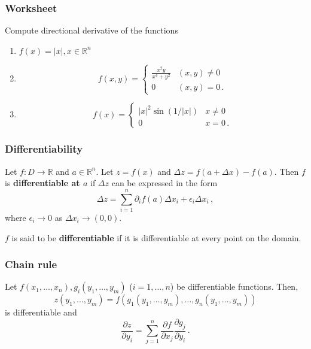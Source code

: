 \documentclass[aspectratio=169,handout]{beamer}
\begin{document}
\begin{frame}
    \frametitle{Worksheet}
    Compute directional derivative of the functions
    \begin{enumerate}
        \item $f(x) = |x|, x\in \mathbb{R}^n$
        \item $$ f(x,y) = 
            \begin{cases}
                \frac{x^2y}{x^4 + y^2} & (x,y) \not= 0 \\
                0 & (x,y) = 0 \,.
            \end{cases}$$
        \item $$ f(x) = 
            \begin{cases}
                |x|^2 \sin(1/|x|) & x\not= 0\\
                0 & x = 0 \,.
            \end{cases}
             $$
    \end{enumerate}
\end{frame}


\begin{frame}
    \frametitle{Differentiability}
\begin{definition}
Let \(f:D \to \mathbb{R}\) and \(a\in \mathbb{R}^n\).
Let \(z = f(x)\) and \(\Delta z = f(a + \Delta x ) - f(a)\).
Then \(f\) is \textbf{differentiable at \(a\)} if \(\Delta z\) can be
expressed in the form
\begin{equation*}
    \Delta z = \sum_{i=1}^n \partial_i f(a) \Delta x_i +  \epsilon_i \Delta x_i  \,,
\end{equation*}
where \(\epsilon_i \to 0\) as \(\Delta x_i \to (0,0)\).

\(f\) is said to be \textbf{differentiable} if it is differentiable at every point on the domain.
\end{definition}
\end{frame}


\begin{frame}
    \frametitle{Chain rule}
\begin{theorem}
Let \(f(x_1,\dots, x_n), g_i(y_1,\dots, y_m)\) (\(i = 1,\dots, n\)) be
differentiable
functions.
Then,
\[z(y_1, \dots, y_m) = f(g_1(y_1, \dots, y_m), \dots, g_n(y_1, \dots, y_m))\]
is differentiable and
\begin{equation*}
    \frac{\partial z}{\partial y_i} = \sum_{j=1}^n \frac{\partial f}{\partial x_j} \frac{\partial g_j}{\partial y_i} \,.
\end{equation*}
\end{theorem}
\end{frame}
\end{document}
